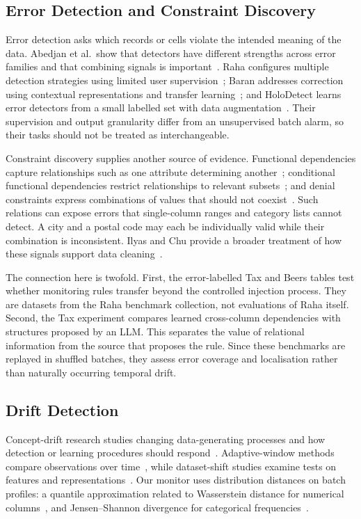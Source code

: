 \subsection{Error Detection and Constraint Discovery}

Error detection asks which records or cells violate the intended meaning of the data. Abedjan et al.\ show that detectors have different strengths across error families and that combining signals is important~\cite{Abedjan2016}. Raha configures multiple detection strategies using limited user supervision~\cite{Mahdavi2019}; Baran addresses correction using contextual representations and transfer learning~\cite{MahdaviAbedjan2020}; and HoloDetect learns error detectors from a small labelled set with data augmentation~\cite{Heidari2019}. Their supervision and output granularity differ from an unsupervised batch alarm, so their tasks should not be treated as interchangeable.

Constraint discovery supplies another source of evidence. Functional dependencies capture relationships such as one attribute determining another~\cite{Papenbrock2015}; conditional functional dependencies restrict relationships to relevant subsets~\cite{Fan2008}; and denial constraints express combinations of values that should not coexist~\cite{Chu2013}. Such relations can expose errors that single-column ranges and category lists cannot detect. A city and a postal code may each be individually valid while their combination is inconsistent. Ilyas and Chu provide a broader treatment of how these signals support data cleaning~\cite{IlyasChu2019}.

The connection here is twofold. First, the error-labelled Tax and Beers tables test whether monitoring rules transfer beyond the controlled injection process. They are datasets from the Raha benchmark collection, not evaluations of Raha itself. Second, the Tax experiment compares learned cross-column dependencies with structures proposed by an LLM. This separates the value of relational information from the source that proposes the rule. Since these benchmarks are replayed in shuffled batches, they assess error coverage and localisation rather than naturally occurring temporal drift.

\subsection{Drift Detection}

Concept-drift research studies changing data-generating processes and how detection or learning procedures should respond~\cite{Gama2014,Webb2016,Lu2019}. Adaptive-window methods compare observations over time~\cite{BifetGavalda2007}, while dataset-shift studies examine tests on features and representations~\cite{Rabanser2019}. Our monitor uses distribution distances on batch profiles: a quantile approximation related to Wasserstein distance for numerical columns~\cite{Ramdas2017}, and Jensen--Shannon divergence for categorical frequencies~\cite{Lin1991}.

